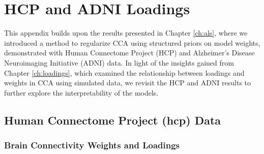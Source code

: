 \graphicspath{{chapters/loadings/}}
\chapter{HCP and ADNI Loadings}\label{appendix:loadings}

This appendix builds upon the results presented in Chapter \ref{ch:als}, where we introduced a method to regularize CCA using structured priors on model weights, demonstrated with Human Connectome Project (HCP) and Alzheimer's Disease Neuroimaging Initiative (ADNI) data. In light of the insights gained from Chapter \ref{ch:loadings}, which examined the relationship between loadings and weights in CCA using simulated data, we revisit the HCP and ADNI results to further explore the interpretability of the models.


\section{Human Connectome Project (\acrshort{hcp}) Data}

\subsection{Brain Connectivity Weights and Loadings}

